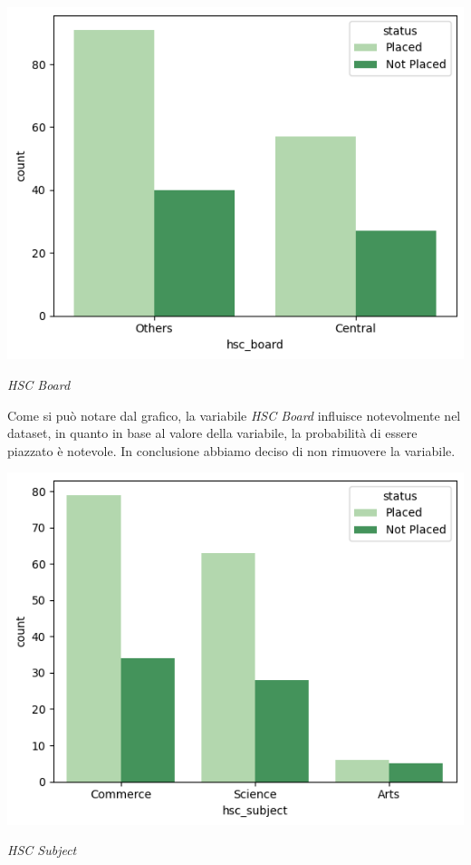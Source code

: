 \documentclass[12pt]{article}
\begin{document}
\begin{center}
    \includegraphics[scale=0.5]{hscboard.png}

    \textit{HSC Board}
\end{center}
Come si può notare dal grafico, la variabile \textit{HSC Board} influisce notevolmente nel dataset, in quanto in base al valore della variabile, la probabilità di essere piazzato è notevole.
In conclusione abbiamo deciso di non rimuovere la variabile.
\begin{center}
    \includegraphics[scale=0.5]{hscsubject.png}

    \textit{HSC Subject}
\end{center}
\end{document}
